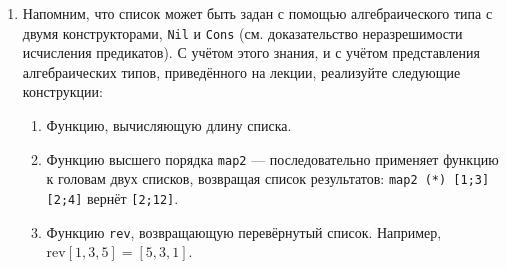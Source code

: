 \documentclass[10pt,a4paper,oneside]{article}
\begin{document}
\begin{enumerate}
Например, зададим функцию, возводящую 2 в соответствующую степень: $$P := \lambda f.\lambda x.(IsZero\ x)\ 1\ ((f\ (Dec\ x)) \cdot 2)$$
Сравните это с кодом на Си: 
\begin{center}\verb!unsigned f (unsigned x) { return x == 0 ? 1 : f (x-1) * 2; }!\end{center}
Тогда, вызванная как $Y\ P\ x$, эта функция вычислит $2^x$. Например, $Y\ P\ 1 =_\beta$

\vspace{-0.3cm}
$$\begin{array}{l}=_\beta P\ (Y\ P)\ 1 = (\lambda f.\lambda x.(IsZero\ x)\ 1\ ((f (Dec\ x))\cdot 2)))\ (Y\ P)\ 1 \\
  =_\beta (IsZero\ 1)\ 1\ ((Y\ P\ (Dec\ 1)) \cdot 2))) =_\beta (Y\ P\ 0) \cdot 2 \\
  =_\beta (P\ (Y\ P)\ 0) \cdot 2 \\
  =_\beta (IsZero\ 0)\ 1\ ((Y\ P\ (Dec\ 0)) \cdot 2))) \cdot 2\\
  =_\beta 1 \cdot 2 =_\beta 2\end{array}$$

С помощью $Y$-комбинатора реализуйте:
\begin{enumerate}
\item Вычисление $k$-го простого числа.
\item Частичный логарифм.
\item Предложите три других комбинатора неподвижной точки (других --- то есть, не бета-экви\-ва\-лент\-ных $Y$ и между собой).
\end{enumerate}

\item Напомним, что список может быть задан с помощью алгебраического типа с двумя конструкторами, \verb!Nil! и \verb!Cons!
(см. доказательство неразрешимости исчисления предикатов). С учётом этого знания, и с учётом представления 
алгебраических типов, приведённого на лекции, реализуйте следующие конструкции:
\begin{enumerate}
\item Функцию, вычисляющую длину списка.
\item Функцию высшего порядка \verb!map2! --- последовательно применяет функцию к головам двух списков, возвращая список результатов:
\verb!map2 (*) [1;3] [2;4]! вернёт \verb![2;12]!.
\item Функцию \verb!rev!, возвращающую перевёрнутый список. Например, $\text{rev}[1,3,5] = [5,3,1]$.
\end{enumerate}


\end{enumerate}
\end{document}
